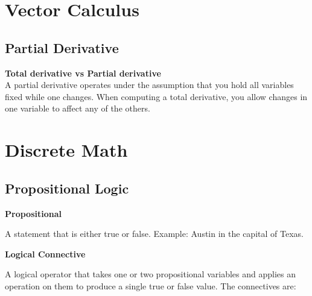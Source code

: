 \documentclass{article}
\numberwithin{theorem}{subsection}
\numberwithin{theorem}{subsubsection}
\numberwithin{lemma}{subsection}
\numberwithin{lemma}{subsubsection}
\theoremstyle{definition}
\numberwithin{definition}{subsection}
\numberwithin{definition}{subsubsection}
\begin{document}
\section{Vector Calculus}

\subsection{Partial Derivative}
\noindent \textbf{Total derivative vs Partial derivative}\\
A partial derivative  operates under the assumption that you hold all variables fixed while one changes. When computing a total derivative, you allow changes in one variable to affect any of the others.

\begin{comment}
======================================================================================================================================================================================================================================================================================DISCRETE MATH=================================================== ====================================================================================================================================================================================================================================
\end{comment}

\section{Discrete Math}

\subsection{Propositional Logic}

\begin{flushleft}
\textbf{Propositional}
\end{flushleft}
A statement that is either true or false. Example: Austin in the capital of Texas.


\begin{flushleft}
\textbf{Logical Connective}
\end{flushleft}
A logical operator that takes one or two propositional variables and applies an operation on them to produce a single true or false value. The connectives are:
\end{document}
